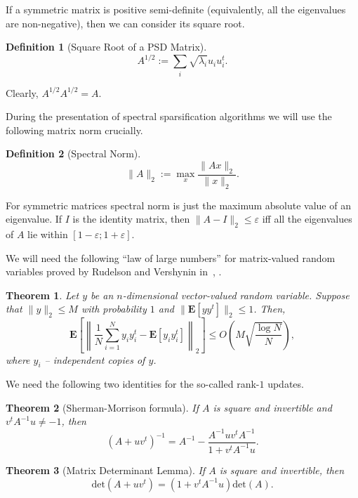 \documentclass[12pt]{article}
\newcommand{\eps}{\varepsilon}
\newtheorem{theorem}{Theorem}
\newtheorem{definition}{Definition}
\begin{document}
    If a symmetric matrix is positive semi-definite (equivalently, all the eigenvalues
    are non-negative), then we can consider its square root.

    \begin{definition}[Square Root of a PSD Matrix]
        $$
            A^{1/2} := \sum_{i} \sqrt{\lambda_i} u_i u_i^t.
        $$
    \end{definition}
    Clearly, $A^{1/2} A^{1/2} = A$.

    During the presentation of spectral sparsification algorithms we will use the following
    matrix norm crucially.

    \begin{definition}[Spectral Norm]
        $$
            \|A\|_2 := \max_{x} \frac{\|Ax\|_2}{\|x\|_2}.
        $$
    \end{definition}

    For symmetric matrices spectral norm is just the maximum absolute value of an eigenvalue.
    If $I$ is the identity matrix, then $\|A - I\|_2 \leq \eps$ iff all the eigenvalues of
    $A$ lie within $[1 - \eps; 1 + \eps]$.

    We will need the following ``law of large numbers'' for matrix-valued random variables proved by Rudelson and Vershynin
    in~\cite{R96}, \cite{RV07}.
    \begin{theorem}
        \label{rv_inequality}
        Let $y$ be an $n$-dimensional vector-valued random variable.
        Suppose that $\|y\|_2 \leq M$ with probability $1$ and
        $\|\mathbf{E}[yy^t]\|_2 \leq 1$. Then,
        \begin{equation}
            \label{rv_formula}
            \mathbf{E}\left[\left\|\frac{1}{N} \sum_{i = 1}^{N} y_i y_i^t - \mathbf{E}[y_i y_i^t]\right\|_2\right]
            \leq O\left(M \sqrt{\frac{\log N}{N}}\right),
        \end{equation}
        where $y_i$ -- independent copies of $y$.
    \end{theorem}

    We need the following two identities for the so-called rank-$1$ updates.

    \begin{theorem}[Sherman-Morrison formula]
        If $A$ is square and invertible and $v^tA^{-1}u \ne -1$, then
        $$
            (A + uv^t)^{-1} = A^{-1} - \frac{A^{-1}uv^tA^{-1}}{1 + v^tA^{-1}u}.
        $$
    \end{theorem}

    \begin{theorem}[Matrix Determinant Lemma]
        If $A$ is square and invertible, then
        $$
            \mathrm{det}(A + uv^t) = (1 + v^tA^{-1}u) \mathrm{det}(A).
        $$
    \end{theorem}
\end{document}
